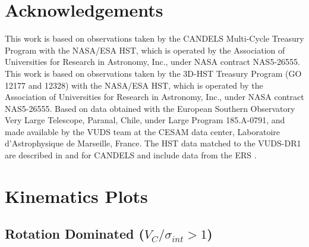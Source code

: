 \documentclass[fleqn,usenatbib]{mn2e}
\begin{document}
\section*{Acknowledgements}

This work is based on observations taken by the CANDELS Multi-Cycle Treasury Program with the NASA/ESA HST, which is operated by the Association of Universities for Research in Astronomy, Inc., under NASA contract NAS5-26555.
This work is based on observations taken by the 3D-HST Treasury Program (GO 12177 and 12328) with the NASA/ESA HST, which is operated by the Association of Universities for Research in Astronomy, Inc., under NASA contract NAS5-26555.
Based on data obtained with the European Southern Observatory Very Large Telescope, Paranal, Chile, under Large Program 185.A-0791, and made available by the VUDS team at the CESAM data center, Laboratoire d'Astrophysique de Marseille, France.
The HST data matched to the VUDS-DR1 are described in \cite{Grogin2011} and \cite{Koekemoer2011} for CANDELS and include data from the ERS \cite{Windhorst2011}.




%


\clearpage 

%


\clearpage


\appendix

\section{Kinematics Plots}\label{app:kinematics_plots}
\subsection{Rotation Dominated ($V_{C}/\sigma_{int} > 1$)}\label{app:rotation_dominated}
\end{document}
